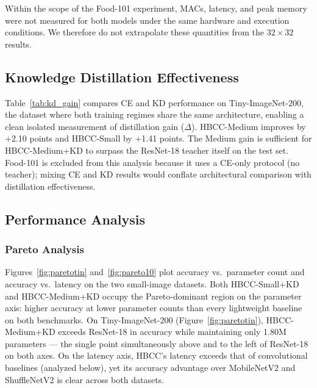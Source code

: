 \documentclass[conference]{IEEEtran}
\begin{document}
Within the scope of the Food-101 experiment, MACs, latency, and peak
memory were not measured for both models under the same hardware and
execution conditions. We therefore do not extrapolate these quantities
from the $32\!\times\!32$ results.

\subsection{Knowledge Distillation Effectiveness}

Table~\ref{tab:kd_gain} compares CE and KD performance on
Tiny-ImageNet-200, the dataset where both training regimes share the
same architecture, enabling a clean isolated measurement of
distillation gain ($\Delta$). HBCC-Medium improves by $+$2.10 points
and HBCC-Small by $+$1.41 points. The Medium gain is sufficient for
HBCC-Medium+KD to surpass the ResNet-18 teacher itself on the test
set. Food-101 is excluded from this analysis because it uses a CE-only
protocol (no teacher); mixing CE and KD results would conflate
architectural comparison with distillation effectiveness.

\begin{table}[ht!]
  \caption{Top-1 accuracy gain from KD ($\Delta$~=~KD~$-$~CE,
           same architecture) on Tiny-ImageNet-200.}
  \label{tab:kd_gain}
  \centering
  \renewcommand{\arraystretch}{1.15}
\end{table}

\subsection{Performance Analysis}

\subsubsection{Pareto Analysis}

Figures~\ref{fig:paretotin} and~\ref{fig:pareto10} plot accuracy
vs.\ parameter count and accuracy vs.\ latency on the two small-image
datasets. Both HBCC-Small+KD and HBCC-Medium+KD occupy the
Pareto-dominant region on the parameter axis: higher accuracy at lower
parameter counts than every lightweight baseline on both benchmarks.
On Tiny-ImageNet-200 (Figure~\ref{fig:paretotin}), HBCC-Medium+KD
exceeds ResNet-18 in accuracy while maintaining only 1.80M parameters
--- the single point simultaneously above and to the left of ResNet-18
on both axes. On the latency axis, HBCC's latency exceeds that of
convolutional baselines (analyzed below), yet its accuracy advantage
over MobileNetV2 and ShuffleNetV2 is clear across both datasets.
\end{document}
